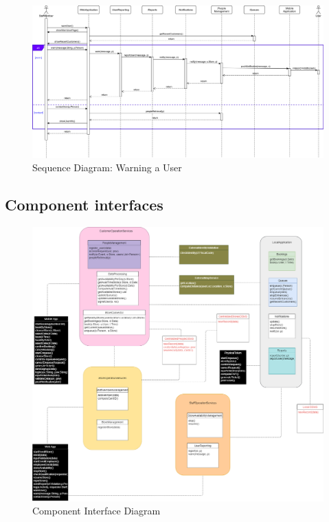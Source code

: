 \begin{landscape}
\begin{figure}[H]
	\includegraphics[width=\linewidth]{../Diagrams/Sequence/sequence_user_warn.png}
	\caption{Sequence Diagram: Warning a User}
	\label{fig:sUserWarn}
\end{figure}

\end{landscape}
\subsection{Component interfaces}
\begin{figure}[H]
	\includegraphics[width=\linewidth]{../Diagrams/Component Interface.png}
	\caption{Component Interface Diagram}
	\label{fig:CompInt}
\end{figure}

